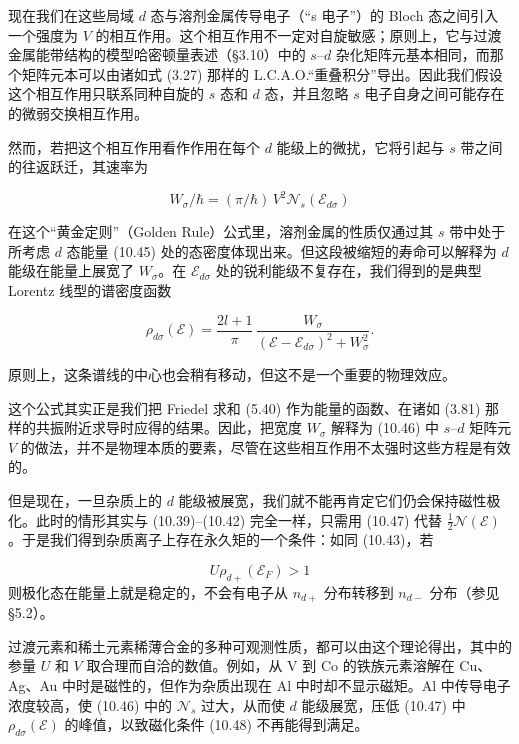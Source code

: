 现在我们在这些局域 $d$ 态与溶剂金属传导电子（“s 电子”）的 Bloch 态之间引入一个强度为 $V$ 的相互作用。这个相互作用不一定对自旋敏感；原则上，它与过渡金属能带结构的模型哈密顿量表述（§3.10）中的 $s$–$d$ 杂化矩阵元基本相同，而那个矩阵元本可以由诸如式 (3.27) 那样的 L.C.A.O.“重叠积分”导出。因此我们假设这个相互作用只联系同种自旋的 $s$ 态和 $d$ 态，并且忽略 $s$ 电子自身之间可能存在的微弱交换相互作用。

然而，若把这个相互作用看作作用在每个 $d$ 能级上的微扰，它将引起与 $s$ 带之间的往返跃迁，其速率为

\begin{equation*}
W_\sigma/\hbar = (\pi/\hbar)\, V^2 \mathcal{N}_s(\mathcal{E}_{d\sigma}) \tag{10.46}
\end{equation*}

在这个“黄金定则”（Golden Rule）公式里，溶剂金属的性质仅通过其 $s$ 带中处于所考虑 $d$ 态能量 (10.45) 处的态密度体现出来。但这段被缩短的寿命可以解释为 $d$ 能级在能量上展宽了 $W_\sigma$。在 $\mathcal{E}_{d\sigma}$ 处的锐利能级不复存在，我们得到的是典型 Lorentz 线型的谱密度函数

\begin{equation*}
\rho_{d\sigma}(\mathcal{E}) = \frac{2l+1}{\pi}\, \frac{W_\sigma}{(\mathcal{E} - \mathcal{E}_{d\sigma})^2 + W_\sigma^2}. \tag{10.47}
\end{equation*}

原则上，这条谱线的中心也会稍有移动，但这不是一个重要的物理效应。

这个公式其实正是我们把 Friedel 求和 (5.40) 作为能量的函数、在诸如 (3.81) 那样的共振附近求导时应得的结果。因此，把宽度 $W_\sigma$ 解释为 (10.46) 中 $s$–$d$ 矩阵元 $V$ 的做法，并不是物理本质的要素，尽管在这些相互作用不太强时这些方程是有效的。

但是现在，一旦杂质上的 $d$ 能级被展宽，我们就不能再肯定它们仍会保持磁性极化。此时的情形其实与 (10.39)–(10.42) 完全一样，只需用 (10.47) 代替 $\frac{1}{2}\mathcal{N}(\mathcal{E})$。于是我们得到杂质离子上存在永久矩的一个条件：如同 (10.43)，若

\begin{equation*}
U \rho_{d+}(\mathcal{E}_F) > 1 \tag{10.48}
\end{equation*}
则极化态在能量上就是稳定的，不会有电子从 $n_{d+}$ 分布转移到 $n_{d-}$ 分布（参见 §5.2）。

过渡元素和稀土元素稀薄合金的多种可观测性质，都可以由这个理论得出，其中的参量 $U$ 和 $V$ 取合理而自洽的数值。例如，从 V 到 Co 的铁族元素溶解在 Cu、Ag、Au 中时是磁性的，但作为杂质出现在 Al 中时却不显示磁矩。Al 中传导电子浓度较高，使 (10.46) 中的 $\mathcal{N}_s$ 过大，从而使 $d$ 能级展宽，压低 (10.47) 中 $\rho_{d\sigma}(\mathcal{E})$ 的峰值，以致磁化条件 (10.48) 不再能得到满足。

